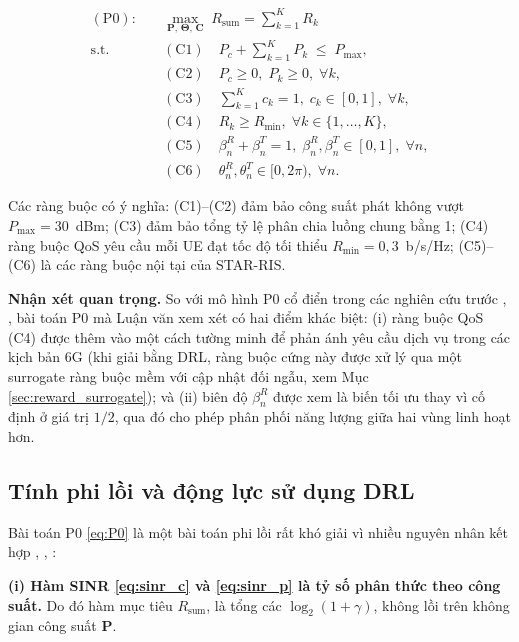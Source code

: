 \begin{equation}
\begin{aligned}
(\text{P0}):\quad & \max_{\mathbf{P},\,\boldsymbol{\Theta},\,\mathbf{C}}
\; R_{\text{sum}} = \sum_{k=1}^{K} R_k \\[2pt]
\text{s.t.}\quad
& (\text{C1})\quad P_c + \sum_{k=1}^{K} P_k \;\leq\; P_{\max}, \\
& (\text{C2})\quad P_c \geq 0,\; P_k \geq 0,\; \forall k, \\
& (\text{C3})\quad \sum_{k=1}^{K} c_k = 1,\; c_k \in [0,1],\; \forall k, \\
& (\text{C4})\quad R_k \geq R_{\min},\; \forall k \in \{1,\ldots,K\}, \\
& (\text{C5})\quad \beta_n^R + \beta_n^T = 1,\;
                   \beta_n^R, \beta_n^T \in [0,1],\; \forall n, \\
& (\text{C6})\quad \theta_n^R, \theta_n^T \in [0, 2\pi),\; \forall n.
\end{aligned}
\label{eq:P0}
\end{equation}

Các ràng buộc có ý nghĩa: (C1)--(C2) đảm bảo công suất phát không vượt
$P_{\max}=30$~dBm; (C3) đảm bảo tổng tỷ lệ phân chia luồng chung bằng 1;
(C4) ràng buộc QoS yêu cầu mỗi UE đạt tốc độ tối thiểu
$R_{\min}=0{,}3$~b/s/Hz; (C5)--(C6) là các ràng buộc nội tại của STAR-RIS.

\textbf{Nhận xét quan trọng.} So với mô hình P0 cổ điển trong các nghiên
cứu trước \cite{mao2022rsma}, \cite{gomes2024performance}, bài toán P0 mà Luận
văn xem xét có hai điểm khác biệt: (i) ràng buộc QoS (C4) được thêm vào
một cách tường minh để phản ánh yêu cầu dịch vụ trong các kịch bản 6G
(khi giải bằng DRL, ràng buộc cứng này được xử lý qua một surrogate
ràng buộc mềm với cập nhật đối ngẫu, xem Mục \ref{sec:reward_surrogate});
và (ii) biên độ $\beta_n^R$ được xem là biến tối ưu thay
vì cố định ở giá trị $1/2$, qua đó cho phép phân phối năng lượng giữa hai
vùng linh hoạt hơn.

\subsection{Tính phi lồi và động lực sử dụng DRL}

Bài toán P0 \eqref{eq:P0} là một bài toán phi lồi rất khó giải vì nhiều
nguyên nhân kết hợp \cite{wu2020smart}, \cite{mao2022rsma}, \cite{irkicatal2024deep}:

\textbf{(i) Hàm SINR \eqref{eq:sinr_c} và \eqref{eq:sinr_p} là tỷ số phân
thức theo công suất.} Do đó hàm mục tiêu $R_{\text{sum}}$, là tổng các
$\log_2(1+\gamma)$, không lồi trên không gian công suất $\mathbf{P}$.

